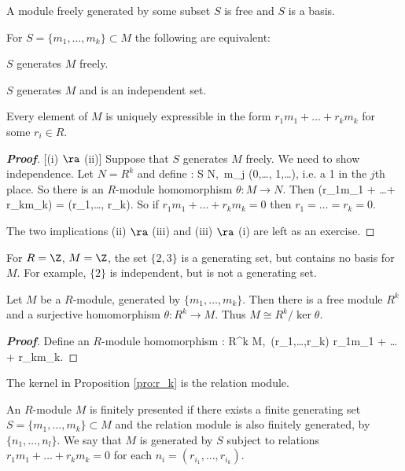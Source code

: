 \begin{definition}
A module freely generated by some subset $S$ is free and $S$ is a basis.
\end{definition}

\begin{proposition}
For $S = \{m_1,\dots ,m_k\} \subset M$ the following are equivalent:
\ben
\item [(i)] $S$ generates $M$ freely.
\item [(ii)] $S$ generates $M$ and is an independent set.
\item [(iii)] Every element of $M$ is uniquely expressible in the form $r_1m_1+\dots+r_km_k$ for some $r_i \in R$.
\een
\end{proposition}

\begin{proof}[\bf Proof]
[(i) $\ra$ (ii)] Suppose that $S$ generates $M$ freely. We need to show independence. Let $N = R^k$ and define
\be
\psi : S \to N,\ m_j \mapsto  (0,\dots , 1,\dots),
\ee
i.e. a 1 in the $j$th place. So there is an $R$-module homomorphism $\theta : M \to N$. Then
\be
\theta(r_1m_1 + \dots + r_km_k) = (r_1,\dots , r_k).
\ee
So if $r_1m_1 + \dots + r_km_k = 0$ then $r_1 = \dots = r_k = 0$.

The two implications (ii) $\ra$ (iii) and (iii) $\ra$ (i) are left as an exercise.
\end{proof}

\begin{example}
For $R = \Z$, $M = \Z$, the set $\{2, 3\}$ is a generating set, but contains no basis for $M$. For example, $\{2\}$ is independent, but is not a generating set.
\end{example}

\begin{proposition}\label{pro:r_k}
Let $M$ be a $R$-module, generated by $\{m_1,\dots ,m_k\}$. Then there is a free module $R^k$ and a surjective homomorphism $\theta : R^k \to M$. Thus $M \cong R^k/ \ker \theta$.
\end{proposition}

\begin{proof}[\bf Proof]
Define an $R$-module homomorphism
\be
\theta : R^k \to M,\ (r_1,\dots ,r_k) \mapsto  r_1m_1 + \dots + r_km_k.
\ee
\end{proof}

The kernel in Proposition \ref{pro:r_k} is the relation module.

\begin{definition}
An $R$-module $M$ is finitely presented if there exists a finite generating set $S = \{m_1,\dots ,m_k\} \subset M$ and the relation module is also finitely generated, by $\{n_1,\dots , n_l\}$. We say that $M$ is generated by $S$ subject to relations $r_1m_1+\dots+r_km_k = 0$ for each $n_i = (r_{i_1},\dots,r_{i_k})$.
\end{definition}

